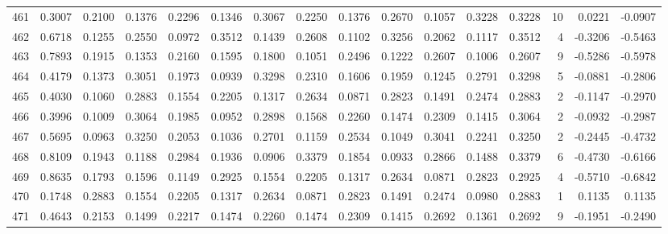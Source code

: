 \begin{tabular}{lrrrrrrrrrrrrrrr}
461 &      0.3007 &  0.2100 &  0.1376 &  0.2296 &  0.1346 &  0.3067 &  0.2250 &  0.1376 &  0.2670 &  0.1057 &   0.3228 &     0.3228 &     10 &                    0.0221 &                    -0.0907 \\
462 &      0.6718 &  0.1255 &  0.2550 &  0.0972 &  0.3512 &  0.1439 &  0.2608 &  0.1102 &  0.3256 &  0.2062 &   0.1117 &     0.3512 &      4 &                   -0.3206 &                    -0.5463 \\
463 &      0.7893 &  0.1915 &  0.1353 &  0.2160 &  0.1595 &  0.1800 &  0.1051 &  0.2496 &  0.1222 &  0.2607 &   0.1006 &     0.2607 &      9 &                   -0.5286 &                    -0.5978 \\
464 &      0.4179 &  0.1373 &  0.3051 &  0.1973 &  0.0939 &  0.3298 &  0.2310 &  0.1606 &  0.1959 &  0.1245 &   0.2791 &     0.3298 &      5 &                   -0.0881 &                    -0.2806 \\
465 &      0.4030 &  0.1060 &  0.2883 &  0.1554 &  0.2205 &  0.1317 &  0.2634 &  0.0871 &  0.2823 &  0.1491 &   0.2474 &     0.2883 &      2 &                   -0.1147 &                    -0.2970 \\
466 &      0.3996 &  0.1009 &  0.3064 &  0.1985 &  0.0952 &  0.2898 &  0.1568 &  0.2260 &  0.1474 &  0.2309 &   0.1415 &     0.3064 &      2 &                   -0.0932 &                    -0.2987 \\
467 &      0.5695 &  0.0963 &  0.3250 &  0.2053 &  0.1036 &  0.2701 &  0.1159 &  0.2534 &  0.1049 &  0.3041 &   0.2241 &     0.3250 &      2 &                   -0.2445 &                    -0.4732 \\
468 &      0.8109 &  0.1943 &  0.1188 &  0.2984 &  0.1936 &  0.0906 &  0.3379 &  0.1854 &  0.0933 &  0.2866 &   0.1488 &     0.3379 &      6 &                   -0.4730 &                    -0.6166 \\
469 &      0.8635 &  0.1793 &  0.1596 &  0.1149 &  0.2925 &  0.1554 &  0.2205 &  0.1317 &  0.2634 &  0.0871 &   0.2823 &     0.2925 &      4 &                   -0.5710 &                    -0.6842 \\
470 &      0.1748 &  0.2883 &  0.1554 &  0.2205 &  0.1317 &  0.2634 &  0.0871 &  0.2823 &  0.1491 &  0.2474 &   0.0980 &     0.2883 &      1 &                    0.1135 &                     0.1135 \\
471 &      0.4643 &  0.2153 &  0.1499 &  0.2217 &  0.1474 &  0.2260 &  0.1474 &  0.2309 &  0.1415 &  0.2692 &   0.1361 &     0.2692 &      9 &                   -0.1951 &                    -0.2490 \\

\end{tabular}
